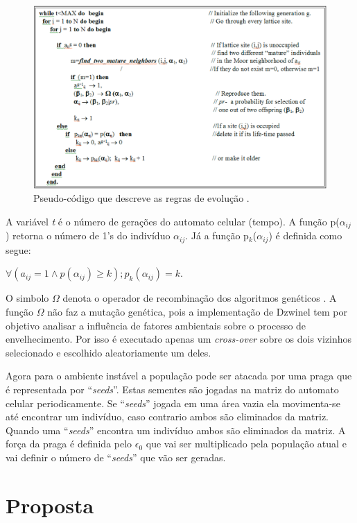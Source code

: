 \documentclass[12pt]{article}
\begin{document}
\begin{figure}[ht]
\centering
\includegraphics[width=.5\textwidth]{imagens/pseudo-codigo-evolucao.png}
\caption{Pseudo-código que descreve as regras de evolução \cite{dzwinel:04}.}
\label{fig:pseudo-codigo-evolucao}
\end{figure}

A variável \textit{t} é o número de gerações do automato celular (tempo). A
função p($\alpha _{ij}$) retorna o número de 1's do indivíduo
\textbf{$\alpha _{ij}$}. Já a função p$_{k}$($\alpha _{ij}$) é definida como
segue:

$\forall (a_{ij} = 1 \wedge p(\alpha _{ij}) \geq k); p_{k}(\alpha_{ij}) = k.$

O simbolo \textbf{$\Omega$} denota o operador de recombinação dos algoritmos
genéticos \cite{dzwinel:04}. A função \textbf{$\Omega$} não faz a mutação
genética, pois a implementação de Dzwinel tem por objetivo analisar a
influência de fatores ambientais sobre o processo de envelhecimento. Por isso
é executado apenas um \textit{cross-over} sobre os dois vizinhos selecionado e
escolhido aleatoriamente um deles.

Agora para o ambiente instável a população pode ser atacada por uma praga que
é representada por ``\textit{seeds}''. Estas sementes são jogadas na matriz do
automato celular periodicamente. Se ``\textit{seeds}'' jogada em uma área 
vazia ela movimenta-se até encontrar um indivíduo, caso contrario ambos são
eliminados da matriz. Quando uma ``\textit{seeds}'' encontra um indivíduo
ambos são eliminados da matriz. A força da praga é definida pelo
$\epsilon_{0}$ que vai ser multiplicado pela população atual e vai definir o
número de ``\textit{seeds}'' que vão ser geradas.


\section{Proposta}
\end{document}
